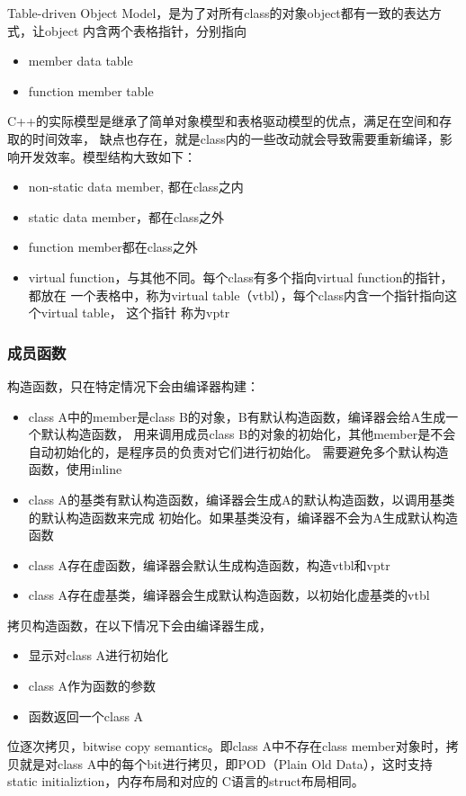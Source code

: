 Table-driven Object Model，是为了对所有class的对象object都有一致的表达方式，让object
内含两个表格指针，分别指向
\begin{itemize}
    \item {member data table}
    \item {function member table}
\end{itemize}

C++的实际模型是继承了简单对象模型和表格驱动模型的优点，满足在空间和存取的时间效率，
缺点也存在，就是class内的一些改动就会导致需要重新编译，影响开发效率。模型结构大致如下：
\begin{itemize}
    \item {non-static data member, 都在class之内}
    \item {static data member，都在class之外}
    \item {function member都在class之外}
    \item {virtual function，与其他不同。每个class有多个指向virtual function的指针，都放在
    一个表格中，称为virtual table（vtbl），每个class内含一个指针指向这个virtual table， 这个指针
    称为vptr}
\end{itemize}

\subsubsection{成员函数}
构造函数，只在特定情况下会由编译器构建：
\begin{itemize}
    \item {class A中的member是class B的对象，B有默认构造函数，编译器会给A生成一个默认构造函数，
    用来调用成员class B的对象的初始化，其他member是不会自动初始化的，是程序员的负责对它们进行初始化。
    需要避免多个默认构造函数，使用inline}
    \item {class A的基类有默认构造函数，编译器会生成A的默认构造函数，以调用基类的默认构造函数来完成
    初始化。如果基类没有，编译器不会为A生成默认构造函数}
    \item {class A存在虚函数，编译器会默认生成构造函数，构造vtbl和vptr}
    \item {class A存在虚基类，编译器会生成默认构造函数，以初始化虚基类的vtbl}
\end{itemize}

拷贝构造函数，在以下情况下会由编译器生成，
\begin{itemize}
    \item {显示对class A进行初始化}
    \item {class A作为函数的参数}
    \item {函数返回一个class A}
\end{itemize}
位逐次拷贝，bitwise copy semantics。即class A中不存在class member对象时，拷贝就是对class
A中的每个bit进行拷贝，即POD（Plain Old Data），这时支持static initializtion，内存布局和对应的
C语言的struct布局相同。

